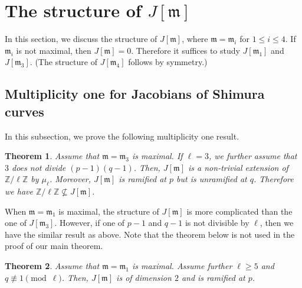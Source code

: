 \documentclass[a4paper, 12pt]{amsart}
\newtheorem{thm}{Theorem}[section]
\theoremstyle{definition}
\theoremstyle{remark}
\numberwithin{equation}{section} \numberwithin{table}{section}
\begin{document}
\section{The structure of $J[{{\mathfrak{m}}}]$}\label{sec:structure}
In this section, we discuss the structure of $J[{{\mathfrak{m}}}]$, where ${{\mathfrak{m}}}={{\mathfrak{m}}}_i$ for $1\leq i \leq 4$. 
If ${{\mathfrak{m}}}_i$ is not maximal, then $J[{{\mathfrak{m}}}]=0$. Therefore it suffices to study $J[{{\mathfrak{m}}}_1]$ and $J[{{\mathfrak{m}}}_3]$. (The structure of $J[{{\mathfrak{m}}}_4]$ follows by symmetry.)

\subsection{Multiplicity one for Jacobians of Shimura curves}
In this subsection, we prove the following multiplicity one result. 
\begin{thm}\label{thm:multiplicityone}
Assume that ${{\mathfrak{m}}}={{\mathfrak{m}}}_3$ is maximal. 
If $\ell=3$, we further assume that $3$ does not divide $(p-1)(q-1)$.
Then, $J[{{\mathfrak{m}}}]$ is a non-trivial extension of ${{{{\mathbb{Z}}}/{\ell{{\mathbb{Z}}}}}}$ by ${{\mu_{\ell}}}$. Moreover, $J[{{\mathfrak{m}}}]$ is ramified at $p$ but is unramified at $q$. Therefore we have ${{{{\mathbb{Z}}}/{\ell{{\mathbb{Z}}}}}} \nsubseteq J[{{\mathfrak{m}}}]$.
\end{thm}

When ${{\mathfrak{m}}}={{\mathfrak{m}}}_1$ is maximal, the structure of $J[{{\mathfrak{m}}}]$ is more complicated than the one of $J[{{\mathfrak{m}}}_3]$. However, if one of $p-1$ and $q-1$ is not divisible by $\ell$, then we have the similar result as above. Note that the theorem below is not used in the proof of our main theorem.
\begin{thm}\label{thm:multionem=1}
Assume that ${{\mathfrak{m}}}={{\mathfrak{m}}}_1$ is maximal. Assume further $\ell\geq 5$ and $q \not\equiv 1 {{ \!\pmod {\ell}}}$. Then, $J[{{\mathfrak{m}}}]$ is of dimension $2$ and is ramified at $p$.
\end{thm}
\end{document}
